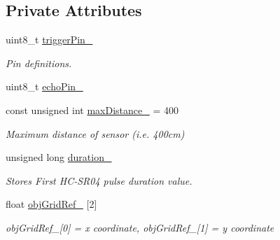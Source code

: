 \subsection*{Private Attributes}
\begin{DoxyCompactItemize}
\item 
uint8\+\_\+t \mbox{\hyperlink{class_obstacle_sensor_ab26ff0855f2f0a009de72b36324d3abb}{trigger\+Pin\+\_\+}}
\begin{DoxyCompactList}\small\item\em Pin definitions. \end{DoxyCompactList}\item 
uint8\+\_\+t \mbox{\hyperlink{class_obstacle_sensor_aecbf317dc02d1c5f1147d5d0b5044dce}{echo\+Pin\+\_\+}}
\item 
const unsigned int \mbox{\hyperlink{class_obstacle_sensor_af980bd4eda58b827f559b0264295c338}{max\+Distance\+\_\+}} = 400
\begin{DoxyCompactList}\small\item\em Maximum distance of sensor (i.\+e. 400cm) \end{DoxyCompactList}\item 
unsigned long \mbox{\hyperlink{class_obstacle_sensor_aa206d6a1ab58f0a98fe00107b80cf764}{duration\+\_\+}}
\begin{DoxyCompactList}\small\item\em Stores First H\+C-\/\+S\+R04 pulse duration value. \end{DoxyCompactList}\item 
float \mbox{\hyperlink{class_obstacle_sensor_a8a5ed0513f7190c94f6362dc8e3f422d}{obj\+Grid\+Ref\+\_\+}} \mbox{[}2\mbox{]}
\begin{DoxyCompactList}\small\item\em obj\+Grid\+Ref\+\_\+\mbox{[}0\mbox{]} = x coordinate, obj\+Grid\+Ref\+\_\+\mbox{[}1\mbox{]} = y coordinate \end{DoxyCompactList}\end{DoxyCompactItemize}
